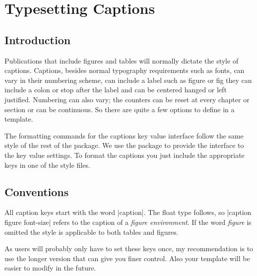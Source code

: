 \chapter{Typesetting Captions}
\section{Introduction}

Publications that include figures and tables will normally dictate
the style of captions. Captions, besides normal typography 
requirements such as fonts, can vary in their numbering scheme, can
include a label such as figure or fig they can include a colon or stop
after the label and can be centered hanged or left justified. 
Numbering can also vary; the counters can be reset at every chapter or section or can be continuous. So
there are quite a few options to define in a template.

The formatting commands for the captions key value interface follow the same style of the rest of the package. We use the  package to provide the interface to the key value settings. To format the captions you just include the appropriate keys in one of the style
files.


\section{Conventions}

All caption keys start with the word |caption|. The float type follows, so |caption figure font-size| refers to the caption of a \textit{figure environment}. If the word \textit{figure} is omitted the style is applicable to both tables and figures. 

As users will probably only have to set these keys once, my recommendation is to use the longer version that can give you finer control. Also your template will be easier to modify in the future.
\medskip

